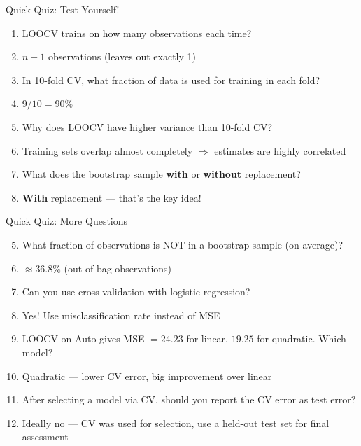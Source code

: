 \documentclass[aspectratio=169, 11pt]{beamer}
\begin{document}
\begin{frame}{Quick Quiz: Test Yourself!}
\begin{enumerate}
  \item LOOCV trains on how many observations each time?
  \pause
  \item[]{\textcolor{muted}{\footnotesize $n-1$ observations (leaves out exactly 1)}}

  \vspace{0.3em}
  \item In 10-fold CV, what fraction of data is used for training in each fold?
  \pause
  \item[]{\textcolor{muted}{\footnotesize $9/10 = 90\%$}}

  \vspace{0.3em}
  \item Why does LOOCV have higher variance than 10-fold CV?
  \pause
  \item[]{\textcolor{muted}{\footnotesize Training sets overlap almost completely $\Rightarrow$ estimates are highly correlated}}

  \vspace{0.3em}
  \item What does the bootstrap sample \textbf{with} or \textbf{without} replacement?
  \pause
  \item[]{\textcolor{muted}{\footnotesize \textbf{With} replacement --- that's the key idea!}}
\end{enumerate}
\end{frame}


\begin{frame}{Quick Quiz: More Questions}
\begin{enumerate}
  \setcounter{enumi}{4}
  \item What fraction of observations is NOT in a bootstrap sample (on average)?
  \pause
  \item[]{\textcolor{muted}{\footnotesize $\approx 36.8\%$ (out-of-bag observations)}}

  \vspace{0.3em}
  \item Can you use cross-validation with logistic regression?
  \pause
  \item[]{\textcolor{muted}{\footnotesize Yes! Use misclassification rate instead of MSE}}

  \vspace{0.3em}
  \item LOOCV on Auto gives MSE $=24.23$ for linear, $19.25$ for quadratic. Which model?
  \pause
  \item[]{\textcolor{muted}{\footnotesize Quadratic --- lower CV error, big improvement over linear}}

  \vspace{0.3em}
  \item After selecting a model via CV, should you report the CV error as test error?
  \pause
  \item[]{\textcolor{muted}{\footnotesize Ideally no --- CV was used for selection, use a held-out test set for final assessment}}
\end{enumerate}
\end{frame}
\end{document}
